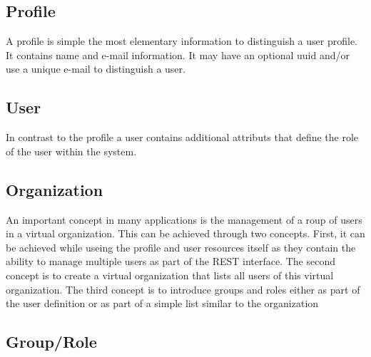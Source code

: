\documentclass[9pt,twocolumn]{styles/osajnl}
\begin{document}
\subsection{Profile}

A profile is simple the most elementary information to distinguish a
user profile. It contains name and e-mail information. It may have an
optional uuid and/or use a unique e-mail to distinguish a
user. 




\subsection{User}

In contrast to the profile a user contains additional attributs that
define the role of the user within the system.



\subsection{Organization}

An important concept in many applications is the management of a roup
of users in a virtual organization. This can be achieved through two
concepts. First, it can be achieved while useing the profile and user
resources itself as they contain the ability to manage multiple users
as part of the REST interface. The second concept is to create a
virtual organization that lists all users of this virtual
organization. The third concept is to introduce groups and roles
either as part of the user definition or as part of a simple list
similar to the organization



\subsection{Group/Role}
\end{document}
